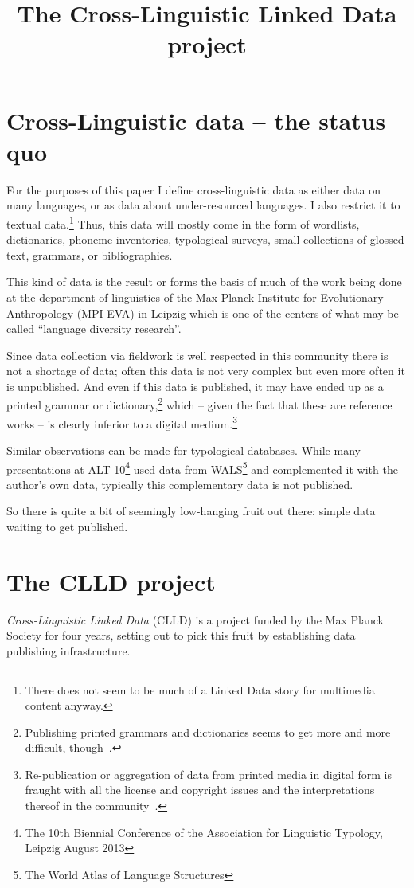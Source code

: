 \documentclass[a4paper,10pt]{article}
\title{The Cross-Linguistic Linked Data project}
\begin{document}
\maketitleabstract

\section{Cross-Linguistic data -- the status quo}
For the purposes of this paper I define cross-linguistic data as either data on many languages, 
or as data about under-resourced languages. I also restrict it to textual data.\footnote{There does not seem to be much of a
Linked Data story for multimedia content anyway.}
Thus, this data will mostly come in the form of 
wordlists, dictionaries, phoneme inventories, typological surveys, small collections of glossed text, grammars, or bibliographies.

This kind of data is the result or forms the basis of much of the work being done at the
department of linguistics of the Max Planck Institute for Evolutionary Anthropology (MPI EVA) in Leipzig which is
one of the centers of what may be called ``language diversity research''.

Since data collection via fieldwork is well respected in this community
there is not a shortage of data;
often this data is not very complex but even more often it is unpublished. And even if this data is published, it may have ended up as a printed grammar or dictionary,\footnote{Publishing printed grammars and dictionaries seems to get more and more difficult, though~\cite{dlc631}.} which -- given the fact that these are reference works -- is clearly inferior to a digital medium.\footnote{Re-publication or aggregation of data from printed media in digital form is fraught with all the license and copyright issues and the interpretations thereof in the community~\cite{austin2011}.}

Similar observations can be made for typological databases. While many presentations at ALT 10\footnote{The 10th Biennial Conference of the Association for Linguistic Typology, Leipzig August 2013} used data from WALS\footnote{The World Atlas of Language Structures} and complemented it with the author's own data, typically this complementary data is not published.

So there is quite a bit of seemingly low-hanging fruit out there: simple data waiting to get published.

\section{The CLLD project}
\emph{Cross-Linguistic Linked Data} (CLLD) is a project funded by the Max Planck Society for four years, 
setting out to pick this fruit by establishing data publishing infrastructure.
\end{document}
